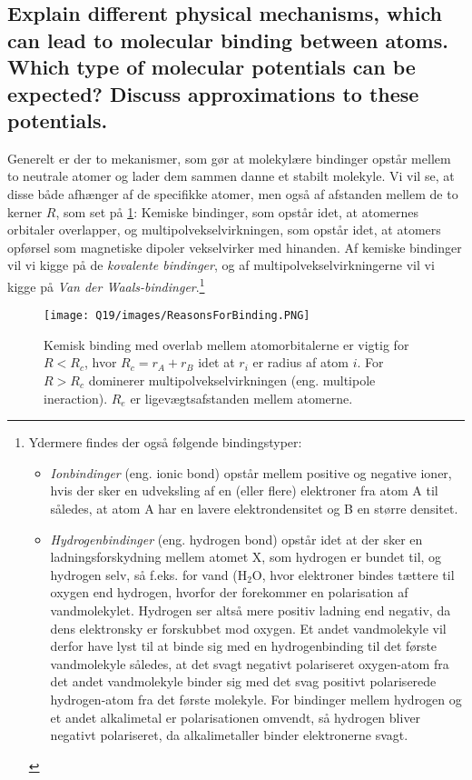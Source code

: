 \subsection{Explain different physical mechanisms, which can lead to molecular binding between atoms. Which type of molecular potentials can be expected? Discuss approximations to these potentials.}


Generelt er der to mekanismer, som gør at molekylære bindinger opstår mellem to neutrale atomer og lader dem sammen danne et stabilt molekyle. Vi vil se, at disse både afhænger af de specifikke atomer, men også af afstanden mellem de to kerner $R$, som set på \cref{fig:Q19_ReasonsForMolecularBinding}: Kemiske bindinger, som opstår idet, at atomernes orbitaler overlapper, og multipolvekselvirkningen, som opstår idet, at atomers opførsel som magnetiske dipoler vekselvirker med hinanden. Af kemiske bindinger vil vi kigge på de \emph{kovalente bindinger}, og af multipolvekselvirkningerne vil vi kigge på \emph{Van der Waals-bindinger}.\footnote{
    Ydermere findes der også følgende bindingstyper:
    \begin{itemize}
        \item \emph{Ionbindinger} (eng. ionic bond) opstår mellem positive og negative ioner, hvis der sker en udveksling af en (eller flere) elektroner fra atom A til  således, at atom A har en lavere elektrondensitet og B en større densitet.
        \item \emph{Hydrogenbindinger} (eng. hydrogen bond) opstår idet at der sker en ladningsforskydning mellem atomet X, som hydrogen er bundet til, og hydrogen selv, så f.eks. for vand ($\text{H}_2\text{O}$, hvor elektroner bindes tættere til oxygen end hydrogen, hvorfor der forekommer en polarisation af vandmolekylet. Hydrogen ser altså mere positiv ladning end negativ, da dens elektronsky er forskubbet mod oxygen. Et andet vandmolekyle vil derfor have lyst til at binde sig med en hydrogenbinding til det første vandmolekyle således, at det svagt negativt polariseret oxygen-atom fra det andet vandmolekyle binder sig med det svag positivt polariserede hydrogen-atom fra det første molekyle. For bindinger mellem hydrogen og et andet alkalimetal er polarisationen omvendt, så hydrogen bliver negativt polariseret, da alkalimetaller binder elektronerne svagt.
    \end{itemize}
}

\begin{figure}[!h]
    \centering
    \texttt{[image: Q19/images/ReasonsForBinding.PNG]}
    \caption{Kemisk binding med overlab mellem atomorbitalerne er vigtig for $R < R_c$, hvor $R_c = r_A + r_B$ idet at $r_i$ er radius af atom $i$. For $R > R_c$ dominerer multipolvekselvirkningen (eng. multipole ineraction). $R_e$ er ligevægtsafstanden mellem atomerne.}
    \label{fig:Q19_ReasonsForMolecularBinding}
\end{figure}


